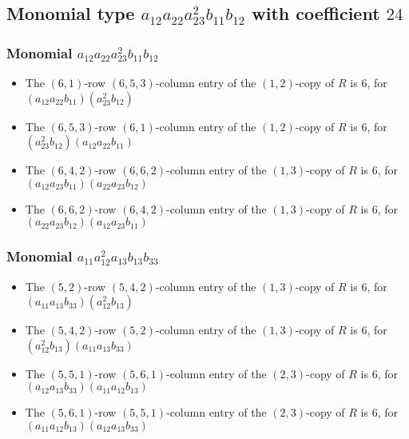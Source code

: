 \documentclass{article}
\begin{document}
\subsection{Monomial type $ a_{12} a_{22} a_{23}^{2} b_{11} b_{12} $ with coefficient $ 24 $}

\subsubsection{Monomial $ a_{12} a_{22} a_{23}^{2} b_{11} b_{12} $}

\begin{itemize}
\item The $(6, 1)$-row $(6, 5, 3)$-column entry of the $ \left(1, 2\right) $-copy of $R$ is $ 6 $, for $( a_{12} a_{22} b_{11} )( a_{23}^{2} b_{12} )$ 
\item The $(6, 5, 3)$-row $(6, 1)$-column entry of the $ \left(1, 2\right) $-copy of $R$ is $ 6 $, for $( a_{23}^{2} b_{12} )( a_{12} a_{22} b_{11} )$ 
\item The $(6, 4, 2)$-row $(6, 6, 2)$-column entry of the $ \left(1, 3\right) $-copy of $R$ is $ 6 $, for $( a_{12} a_{23} b_{11} )( a_{22} a_{23} b_{12} )$ 
\item The $(6, 6, 2)$-row $(6, 4, 2)$-column entry of the $ \left(1, 3\right) $-copy of $R$ is $ 6 $, for $( a_{22} a_{23} b_{12} )( a_{12} a_{23} b_{11} )$ 
\end{itemize}
\subsubsection{Monomial $ a_{11} a_{12}^{2} a_{13} b_{13} b_{33} $}

\begin{itemize}
\item The $(5, 2)$-row $(5, 4, 2)$-column entry of the $ \left(1, 3\right) $-copy of $R$ is $ 6 $, for $( a_{11} a_{13} b_{33} )( a_{12}^{2} b_{13} )$ 
\item The $(5, 4, 2)$-row $(5, 2)$-column entry of the $ \left(1, 3\right) $-copy of $R$ is $ 6 $, for $( a_{12}^{2} b_{13} )( a_{11} a_{13} b_{33} )$ 
\item The $(5, 5, 1)$-row $(5, 6, 1)$-column entry of the $ \left(2, 3\right) $-copy of $R$ is $ 6 $, for $( a_{12} a_{13} b_{33} )( a_{11} a_{12} b_{13} )$ 
\item The $(5, 6, 1)$-row $(5, 5, 1)$-column entry of the $ \left(2, 3\right) $-copy of $R$ is $ 6 $, for $( a_{11} a_{12} b_{13} )( a_{12} a_{13} b_{33} )$ 
\end{itemize}
\end{document}
